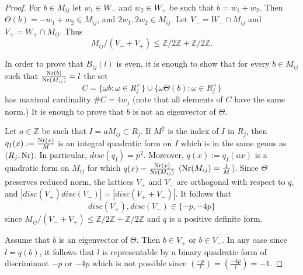 \documentclass[13pt]{amsart}
\theoremstyle{remark}
\numberwithin{theorem}{section} \numberwithin{equation}{section}
\begin{document}
\begin{proof}
For $b \in M_{ij}$ let $w_1\in W_-$ and $w_2 \in W_+$ be such that $b=w_1+w_2$. Then $\Theta(b)=-w_1+w_2\in M_{ij}$, and $2w_1, 2w_2 \in M_{ij}$. Let $V_-=W_- \cap M_{ij}$	and $V_+= W_+ \cap M_{ij}$. Thus 
\[ M_{ij}/(V_- + V_+) \le {\mathbb{Z}}/2{\mathbb{Z}} + {\mathbb{Z}}/2{\mathbb{Z}}. \] 

In order to prove that $B_{ij}(l)$ is even, it is enough to show that for every $b\in M_{ij}$ such that $\frac{{\rm Nr}(b)}{{\rm Nr}(M_{ij})} = l$ the set 
\[ C=\{\omega b: \omega \in R_j^\times\}\cup \{\omega \Theta(b): \omega \in R_j^\times \} \] has maximal cardinality $\#C=4w_j$ (note that all elements of $C$ have the same norm.) It is enough to prove that $b$ is not an eigenvector of $\Theta$.

Let $a\in {\mathbb{Z}}$ be such that $I=aM_{ij}\subset R_j$. If $M^2$ is the index of $I$ in $R_j$, then $q_I(x):=\frac{{\rm Nr}(x)}{M}$ is an integral quadratic form on $I$ which is in the same genus as $(R_j,{\rm Nr})$. In particular, $disc(q_I)=p^2$. Moreover, $q(x):=q_I(ax)$ is a quadratic form on $M_{ij}$ for which $q(x)=\frac{{\rm Nr}(x)}{{\rm Nr}(M_{ij})}$ (${\rm Nr}(M_{ij})=\frac{1}{M}$).
Since $\Theta$ preserves reduced norm, the lattices $V_+$ and $V_-$ are orthogonal with respect to $q$, and $|disc(V_+)disc(V_-)|=|disc(V_+ + V_-)|$. It follows that 
\[disc(V_+), disc(V_-) \in \{-p,-4p \} \] since $M_{ij}/(V_- + V_+) \le {\mathbb{Z}}/2{\mathbb{Z}} + {\mathbb{Z}}/2{\mathbb{Z}}$ and $q$ is a positive definite form.

Assume that $b$ is an eigenvector of $\Theta$. Then $b \in V_+$ or $b\in V_-$. In any case since $l=q(b)$, it follows that $l$ is representable by a binary quadratic form of discriminant $-p$ or $-4p$ which is not possible since 
$\left(\frac{-p}{l}\right)=\left(\frac{-4p}{l}\right)= -1$.
	

\end{proof}
\end{document}
